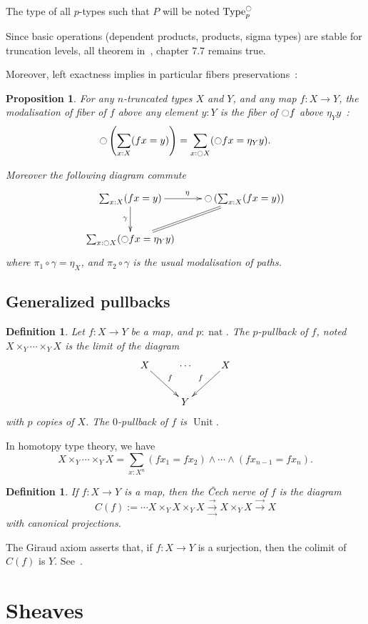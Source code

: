 \documentclass[conference]{IEEEtran}
\newtheorem{prop}[thm]{Proposition}
\newtheorem{defi}[thm]{Definition}
\DeclareMathOperator{\Type}{Type}
\DeclareMathOperator{\nat}{nat}
\DeclareMathOperator{\Unit}{Unit}
\newcommand{\modal}{\ensuremath{\ocircle}}
\begin{document}
The type of all $p$-types such that $P$ will be noted $\Type^\modal_p$

Since basic operations (dependent products, products, sigma types) are
stable for truncation levels, all theorem in~\cite{hottbook}, chapter
7.7 remains true.

Moreover, left exactness implies in particular fibers preservations~:
\begin{prop}
For any $n$-truncated types $X$ and $Y$,
and any map $f:X \to Y$, the modalisation of fiber of $f$ above any element $y:Y$
is the fiber of $\modal f$ above $\eta_Y y$~:
$$\modal \left(\sum_{x:X}  (f x = y)\right) = \sum_{x:\modal X} (\modal f x = \eta_Y y).$$

Moreover the following diagram commute
$$\xymatrix{
  \sum_{x:X} (f x = y) \ar[r]^\eta \ar[d]_\gamma & \modal \left(\sum_{x:X}  (f x = y)\right) \ar@{=}[dl]\\
  \sum_{x:\modal X} (\modal f x = \eta_Y y) &
}$$
where $\pi_1 \circ \gamma = \eta_X$, and $\pi_2 \circ \gamma$ is the
usual modalisation of paths.
\end{prop}
\subsection{Generalized pullbacks}
\label{sec:gener-pb}

\begin{defi}
  Let $f:X \to Y$ be a map, and $p:\nat$. The $p$-pullback of $f$,
  noted $X\times_Y \cdots\times_Y X$ is
  the limit of the diagram
  $$\xymatrix{
    X \ar[rd]^f & \cdots & X \ar[ld]_f \\
      &    Y   &
  }$$
  with $p$ copies of $X$. The $0$-pullback of $f$ is $\Unit$.
\end{defi}

In homotopy type theory, we have 
$$X\times_Y \cdots\times_Y X = \sum_{x:X^n} (f x_1 = f x_2) \land
\cdots \land (f x_{n-1} = f x_n).$$
\begin{defi}
  If $f:X \to Y$ is a map, then the {\em \v{C}ech nerve} of $f$ is the
  diagram
  $$C(f) := \cdots
    X \times_Y X \times_Y X
   \underset{\longrightarrow}{\stackrel{\longrightarrow}{\longrightarrow}}
   X \times_Y X 
\stackrel{\longrightarrow}{\longrightarrow} X$$
with canonical projections.
\end{defi}

The Giraud axiom asserts that, if $f:X\to Y$ is a surjection, then the
colimit of $C(f)$ is $Y$. See~\cite{lurie}.

\section{Sheaves}
\label{sec:sheaves}
\end{document}
